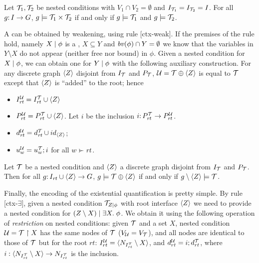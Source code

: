 \begin{proposition}
	\label{pr:and satisfaction}
Let ${\mathcal{T}}_1,{\mathcal{T}}_2$ be {\proper} nested conditions with  $V_1\cap V_2=\emptyset$ and $I_{{\mathcal{T}}_1}=I_{{\mathcal{T}}_2}=I$. For all $g{:}\, I\rightarrow G$, $g\models {\mathcal{T}}_1\times {\mathcal{T}}_2$ if and only if $g\models{\mathcal{T}}_1$ and $g\models {\mathcal{T}}_2$.
\end{proposition}
%

A {\cfor} can be obtained by weakening, using rule [ctx-weak]. If the premises of the rule hold, namely ${X} \mid {\phi}$ is a {\cfor}, $X\subseteq Y$ and $\mathit{bv}(\phi) \cap Y = \emptyset$ we know that the variables in $Y \setminus X$ do not appear (neither free nor bound) in $\phi$. Given a {\proper} nested condition for ${X} \mid {\phi}$, we can obtain one for ${Y} \mid {\phi}$ with the following auxiliary construction. For any discrete graph $\langle Z\rangle$ disjoint from $I_{\mathcal{T}}$ and $P_{\mathcal{T}}$,
${\mathcal{U}}={\mathcal{T}}\oplus \langle Z\rangle$ is equal to ${\mathcal{T}}$ except that $\langle Z\rangle$ is ``added'' to the root; hence
\begin{itemize}
\item $I^{\mathcal{U}}_{\mathit{rt}}=I^{\mathcal{T}}_{\mathit{rt}}\cup \langle Z\rangle$ 
\item $P^{\mathcal{U}}_{\mathit{rt}}=P^{\mathcal{T}}_{\mathit{rt}}\cup \langle Z\rangle$. Let  $i$ be the inclusion $i {:}\, P^{\mathcal{T}}_{\mathit{rt}}\rightarrow P^{\mathcal{U}}_{\mathit{rt}}$. 
\item $d^{\mathcal{U}}_{\mathit{rt}}=d^{\mathcal{T}}_{\mathit{rt}}\cup id_{\langle Z\rangle}$;
\item $u^{\mathcal{U}}_w=u^{\mathcal{T}}_w;i$ for all $w\childof \rt$. 
\end{itemize}

\begin{proposition}
\label{pr:weakening satisfaction}
Let ${\mathcal{T}}$ be a {\proper} nested condition and $\langle Z\rangle$ a discrete graph disjoint from $I_{\mathcal{T}}$ and $P_{\mathcal{T}}$. Then for all $g{:}\, I_{\mathit{rt}}\cup \langle Z\rangle\rightarrow G$, $g\models {\mathcal{T}}\oplus \langle Z\rangle$ if and only if $g\setminus \langle Z\rangle \models{\mathcal{T}}$.
\end{proposition}

Finally, the encoding of the existential quantification is pretty simple. By rule [ctx-$\exists$], given a nested condition ${\mathcal{T}}_{{Z} \mid {\phi}}$ with root interface $\langle Z\rangle$ we need to provide a nested condition for  ${(Z\setminus X)} \mid {\exists X .\;\phi}$. We obtain it using the following operation of \emph{restriction} on nested conditions: given ${\mathcal{T}}$ and a set $X$, nested condition ${\mathcal{U}} = {\mathcal{T}}\restriction X$ has the same nodes of ${\mathcal{T}}$ ($V_{{\mathcal{U}}} = V_{{\mathcal{T}}}$), and all nodes are identical to those of ${\mathcal{T}}$ but for the root $rt$: $I^{\mathcal{U}}_{rt} = \langle N_{I^{{\mathcal{T}}}_{rt}}\setminus X\rangle$, and $d^{\mathcal{U}}_{rt} = i ; d^{{\mathcal{T}}}_{rt}$, where $i: \langle N_{I^{\mathcal{T}}_{rt}}\setminus X\rangle \rightarrow N_{I^{\mathcal{T}}_{rt}}$ is the inclusion. 

